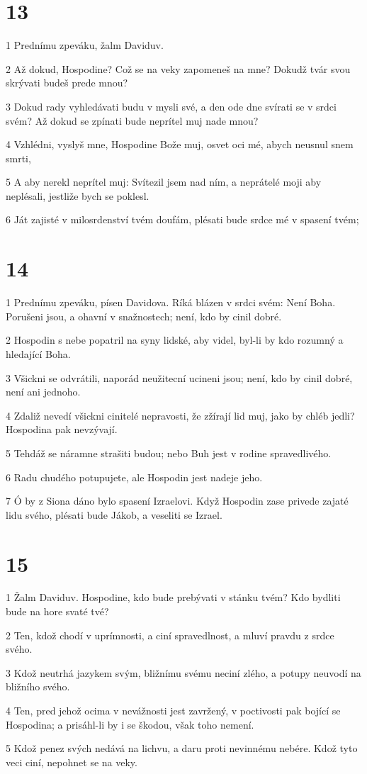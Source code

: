 \chapter{13}

\par 1 Prednímu zpeváku, žalm Daviduv.
\par 2 Až dokud, Hospodine? Což se na veky zapomeneš na mne? Dokudž tvár svou skrývati budeš prede mnou?
\par 3 Dokud rady vyhledávati budu v mysli své, a den ode dne svírati se v srdci svém? Až dokud se zpínati bude neprítel muj nade mnou?
\par 4 Vzhlédni, vyslyš mne, Hospodine Bože muj, osvet oci mé, abych neusnul snem smrti,
\par 5 A aby nerekl neprítel muj: Svítezil jsem nad ním, a neprátelé moji aby neplésali, jestliže bych se poklesl.
\par 6 Ját zajisté v milosrdenství tvém doufám, plésati bude srdce mé v spasení tvém;

\chapter{14}

\par 1 Prednímu zpeváku, písen Davidova. Ríká blázen v srdci svém: Není Boha. Porušeni jsou, a ohavní v snažnostech; není, kdo by cinil dobré.
\par 2 Hospodin s nebe popatril na syny lidské, aby videl, byl-li by kdo rozumný a hledající Boha.
\par 3 Všickni se odvrátili, naporád neužitecní ucineni jsou; není, kdo by cinil dobré, není ani jednoho.
\par 4 Zdaliž nevedí všickni cinitelé nepravosti, že zžírají lid muj, jako by chléb jedli? Hospodina pak nevzývají.
\par 5 Tehdáž se náramne strašiti budou; nebo Buh jest v rodine spravedlivého.
\par 6 Radu chudého potupujete, ale Hospodin jest nadeje jeho.
\par 7 Ó by z Siona dáno bylo spasení Izraelovi. Když Hospodin zase privede zajaté lidu svého, plésati bude Jákob, a veseliti se Izrael.

\chapter{15}

\par 1 Žalm Daviduv. Hospodine, kdo bude prebývati v stánku tvém? Kdo bydliti bude na hore svaté tvé?
\par 2 Ten, kdož chodí v uprímnosti, a ciní spravedlnost, a mluví pravdu z srdce svého.
\par 3 Kdož neutrhá jazykem svým, bližnímu svému neciní zlého, a potupy neuvodí na bližního svého.
\par 4 Ten, pred jehož ocima v nevážnosti jest zavržený, v poctivosti pak bojící se Hospodina; a prisáhl-li by i se škodou, však toho nemení.
\par 5 Kdož penez svých nedává na lichvu, a daru proti nevinnému nebére. Kdož tyto veci ciní, nepohnet se na veky.

